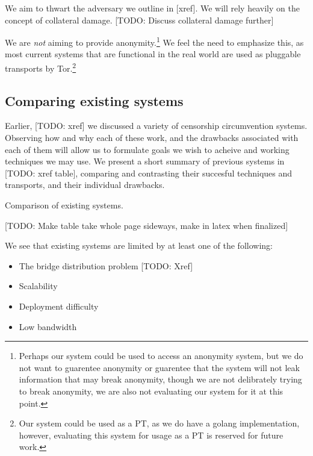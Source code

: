 \documentclass[12pt]{report}
\begin{document}
We aim to thwart the adversary we outline in [xref]. We will rely heavily on the concept of collateral damage. [TODO: Discuss collateral damage further]

We are \emph{not} aiming to provide anonymity.\footnote{Perhaps our system could be used to access an anonymity system, but we do not want to guarentee anonymity or guarentee that the system will not leak information that may break anonymity, though we are not delibrately trying to break anonymity, we are also not evaluating our system for it at this point.} We feel the need to emphasize this, as most current systems that are functional in the real world are used as pluggable transports by Tor.\footnote{Our system could be used as a PT, as we do have a golang implementation, however, evaluating this system for usage as a PT is reserved for future work.}

\subsection{Comparing existing systems}

Earlier, [TODO: xref] we discussed a variety of censorship circumvention systems. Observing how and why each of these work, and the drawbacks associated with each of them will allow us to formulate goals we wish to acheive and working techniques we may use. We present a short summary of previous systems in [TODO: xref table], comparing and contrasting their succesful techniques and transports, and their individual drawbacks.

\begin{table}
\caption{Comparison of existing systems.}
\begin{center}
[TODO: Make table take whole page sideways, make in latex when finalized]
\end{center}
\end{table}

We see that existing systems are limited by at least one of the following:
\begin{itemize}
  \item The bridge distribution problem [TODO: Xref]
  \item Scalability
  \item Deployment difficulty
  \item Low bandwidth
\end{itemize}
\end{document}
